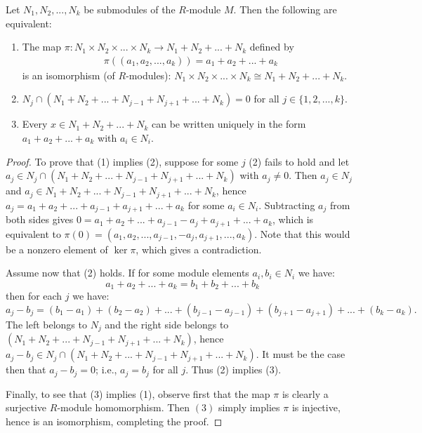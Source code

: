     \begin{proposition}\label{prop:properties-of-direct-prods}
        Let $N_1,N_2,...,N_k$ be submodules of the $R$-module $M$. Then the following are equivalent:
        \begin{enumerate}[label = (\arabic*)]
            \item The map $\pi:N_1 \times N_2 \times ... \times N_k \rightarrow N_1 + N_2 + ... + N_k$ defined by 
                \begin{equation*}
                \begin{split}
                    \pi((a_1,a_2,...,a_k)) = a_1 + a_2 + ... +a_k
                \end{split}
                \end{equation*}
            is an isomorphism (of $R$-modules): $N_1 \times N_2 \times ... \times N_k \cong N_1 + N_2 + ... + N_k$.
            \item $N_j \cap (N_1 + N_2 + ... + N_{j-1} + N_{j+1} + ... + N_k) = 0$ for all $j \in \{1,2,...,k\}$.
            \item Every $x \in N_1 + N_2 + ... + N_k$ can be written uniquely in the form $a_1 + a_2 + ... + a_k$ with $a_i \in N_i$.
        \end{enumerate}
    \end{proposition}
    \begin{proof}
        To prove that (1) implies (2), suppose for some $j$ (2) fails to hold and let $a_j \in N_j \cap (N_1 + N_2 + ... + N_{j-1} + N_{j+1} + ... + N_k)$ with $a_j \neq 0$. Then $a_j \in N_j$ and $a_j \in N_1 + N_2 + ... + N_{j-1} + N_{j+1} + ... + N_k$, hence $a_j = a_1 + a_2 + ... + a_{j-1} + a_{j+1} + ... + a_k$ for some $a_i \in N_i$. Subtracting $a_j$ from both sides gives $0 = a_1 + a_2 + ... + a_{j-1} -a_j + a_{j+1} + ... + a_k$, which is equivalent to $\pi(0) = (a_1,a_2,...,a_{j-1},-a_j,a_{j+1},...,a_k)$. Note that this would be a nonzero element of $\ker{\pi}$, which gives a contradiction.

        Assume now that (2) holds. If for some module elements $a_i , b_i \in N_i$ we have: $$a_1+a_2+...+a_k = b_1+b_2+...+b_k$$ then for each $j$ we have: $$a_j - b_j = (b_1 - a_1)+ (b_2 - a_2)+ ... + (b_{j-1} - a_{j-1}) + (b_{j+1} - a_{j+1}) + ... + (b_k - a_k).$$ The left belongs to $N_j$ and the right side belongs to $(N_1 + N_2 + ... + N_{j-1} + N_{j+1} + ... + N_k)$, hence $a_j - b_j \in N_j \cap (N_1 + N_2 + ... + N_{j-1} + N_{j+1} + ... + N_k)$. It must be the case then that $a_j - b_j = 0$; i.e., $a_j = b_j$ for all $j$. Thus (2) implies (3).

        Finally, to see that (3) implies (1), observe first that the map $\pi$ is clearly a surjective $R$-module homomorphism. Then $(3)$ simply implies $\pi$ is injective, hence is an isomorphism, completing the proof.
    \end{proof}

